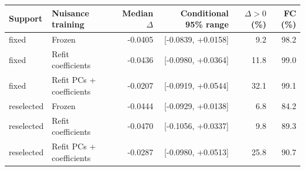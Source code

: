 \begin{tabular}{llrrrr}
\toprule
Support & Nuisance training & Median $\Delta$ & Conditional 95\% range & $\Delta>0$ (\%) & FC (\%) \\
\midrule
fixed & Frozen & -0.0405 & [-0.0839, +0.0158] & 9.2 & 98.2 \\
fixed & Refit coefficients & -0.0436 & [-0.0980, +0.0364] & 11.8 & 99.0 \\
fixed & Refit PCs + coefficients & -0.0207 & [-0.0919, +0.0544] & 32.1 & 99.1 \\
reselected & Frozen & -0.0444 & [-0.0929, +0.0138] & 6.8 & 84.2 \\
reselected & Refit coefficients & -0.0470 & [-0.1056, +0.0337] & 9.8 & 89.3 \\
reselected & Refit PCs + coefficients & -0.0287 & [-0.0980, +0.0513] & 25.8 & 90.7 \\
\bottomrule
\end{tabular}
